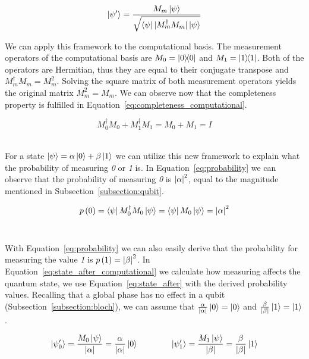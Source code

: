 \begin{equation}\label{eq:state_after}
  \ket{\psi'} = \frac{M_m\ket{\psi}}{\sqrt{\bra{\psi}|M_m^{\dag}M_m|\ket{\psi}}}
\end{equation}

We can apply this framework to the computational basis. The
measurement operators of the computational basis are
\(M_0 = \ketbra{0}{0}\) and \(M_1 = \ketbra{1}{1}\). Both
of the operators are Hermitian, thus they are equal to their
conjugate transpose and \(M_m^{\dag}M_m = M_m^2\). 
Solving the square matrix of both measurement operators 
yields the original matrix \(M_m^2 = M_m\). We can observe
now that the completeness property is fulfilled in
Equation~\ref{eq:completeness_computational}. \

\begin{equation}\label{eq:completeness_computational}
  M_0^{\dag}M_0 + M_1^{\dag}M_1 = M_0 + M_1 = I
\end{equation} \

For a state \(\ket{\psi} = \alpha\ket{0} + \beta\ket{1}\) we
can utilize this new framework to explain what the probability
of measuring \textit{0} or \textit{1} is. In Equation~\ref{eq:probability}
we can observe that the probability of measuring \textit{0} is
\(\abs{\alpha}^2\), equal to the magnitude mentioned
in Subsection~\ref{subsection:qubit}. \

\begin{equation}\label{eq:probability}
  p\left(0\right) = \bra{\psi}M_0^{\dag}M_0\ket{\psi} =
  \bra{\psi}M_0\ket{\psi} = \abs{\alpha}^2
\end{equation} \

With Equation~\ref{eq:probability} we can also easily derive that the probability for
measuring the value \textit{1} is \(p\left(1\right) = \abs{\beta}^2\).
In Equation~\ref{eq:state_after_computational} we calculate how measuring
affects the quantum state, we use Equation~\ref{eq:state_after} with the
derived probability values. Recalling that a global phase has no effect
in a qubit (Subsection~\ref{subsection:bloch}), we can assume that
\(\frac{\alpha}{\abs{\alpha}}\ket{0} = \ket{0}\) and
\(\frac{\beta}{\abs{\beta}}\ket{1} = \ket{1}\). \

\begin{equation}\label{eq:state_after_computational}
    \ket{\psi_0'} = \frac{M_0\ket{\psi}}{\abs{\alpha}} =
    \frac{\alpha}{\abs{\alpha}}\ket{0} \qquad \qquad
    \ket{\psi_1'} = \frac{M_1\ket{\psi}}{\abs{\beta}} =
    \frac{\beta}{\abs{\beta}}\ket{1}
\end{equation} \

